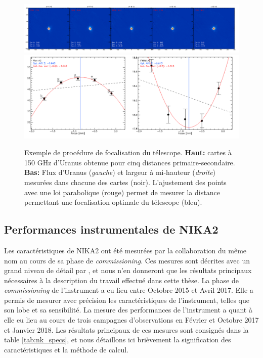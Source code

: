 \begin{figure}[t]
    \centering
    \includegraphics[width=.9\linewidth]{Figures/Chap_nk/focus_maps_crop.png}
    \includegraphics[width=.9\linewidth]{Figures/Chap_nk/focus_results_crop.pdf}
    \caption{
        Exemple de procédure de focalisation du télescope.
        \textbf{Haut:} cartes à 150 GHz d'Uranus obtenue pour cinq distances primaire-secondaire.
        \textbf{Bas:} Flux d'Uranus (\textit{gauche}) et largeur à mi-hauteur (\textit{droite}) mesurées dans chacune des cartes (noir).
        L'ajustement des points avec une loi parabolique (rouge) permet de mesurer la distance permettant une focalisation optimale du télescope (bleu).
    }
    \label{fig:nk_focus}
\end{figure}

\subsection{Performances instrumentales de NIKA2}\label{sec:nk_perf}

Les caractéristiques de NIKA2 ont été mesurées par la collaboration du même nom au cours de sa phase de \textit{commissioning}.
Ces mesures sont décrites avec un grand niveau de détail par , et nous n'en donneront que les résultats principaux nécessaires à la description du travail effectué dans cette thèse.
La phase de \textit{commissioning} de l'instrument a eu lieu entre Octobre 2015 et Avril 2017.
Elle a permis de mesurer avec précision les caractéristiques de l'instrument, telles que son lobe et sa sensibilité.
La mesure des performances de l'instrument a quant à elle eu lieu au cours de trois campagnes d'observations en Février et Octobre 2017 et Janvier 2018.
Les résultats principaux de ces mesures sont consignés dans la table \ref{tab:nk_specs}, et nous détaillons ici brièvement la signification des caractéristiques et la méthode de calcul.

